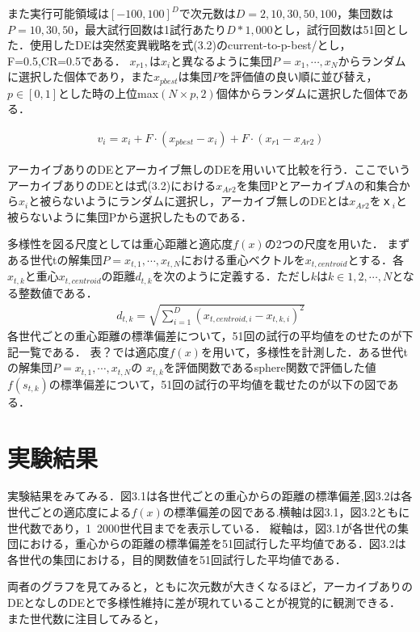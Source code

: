 \documentclass[a4paper,11pt,oneside,openany]{jsbook}
\begin{document}
また実行可能領域は$[-100, 100]^D$で次元数は$D=2,10,30,50,100$，集団数は$P=10,30,50$，最大試行回数は1試行あたり$D*1,000$とし，試行回数は51回とした．使用したDEは突然変異戦略を式(3.2)のcurrent-to-p-best/とし，F=0.5,CR=0.5である．
$x_{r1},$は${x_i}$と異なるように集団$P = {x_1, \cdots, x_N}$からランダムに選択した個体であり，また$x_{pbest}$は集団$P$を評価値の良い順に並び替え，${p\in[0,1]}とした時の上位$max$(N \times p, 2)$個体からランダムに選択した個体である．

\begin{eqnarray}
v_{i} = x_{i} + F\cdot(x_{pbest} - x_{i}) + F\cdot(x_{r1} - x_{Ar2})
\end{eqnarray}

アーカイブありのDEとアーカイブ無しのDEを用いいて比較を行う．ここでいうアーカイブありのDEとは式(3.2)における$x_{Ar2}$を集団PとアーカイブAの和集合から${x_i}$と被らないようにランダムに選択し，アーカイブ無しのDEとは$x_{Ar2}$を$ｘ_{i}$と被らないように集団Pから選択したものである．

多様性を図る尺度としては重心距離と適応度$f(x)$の2つの尺度を用いた．
まずある世代tの解集団$P = {x_{t,1}, \cdots, x_{t,N}}$における重心ベクトルを$x_{t,centroid}$とする．各$x_{t,k}$と重心$x_{t,centroid}$の距離$d_{t,k}$を次のように定義する．ただし$k$は$k\in {1,2,\cdots,N}$となる整数値である．
\begin{eqnarray}
d_{t,k} = \sqrt{\sum_{i=1}^{D} (x_{t,centroid,i} - x_{t,k,i})^2} 
\end{eqnarray}
各世代ごとの重心距離の標準偏差について，51回の試行の平均値をのせたのが下記一覧である．
表？では適応度$f(x)$を用いて，多様性を計測した．ある世代tの解集団$P = {x_{t,1}, \cdots, x_{t,N}}$の $x_{t,k}$を評価関数であるsphere関数で評価した値$f(s_{t,k})$の標準偏差について，51回の試行の平均値を載せたのが以下の図である．

\section{実験結果}
実験結果をみてみる．図3.1は各世代ごとの重心からの距離の標準偏差,図3.2は各世代ごとの適応度による$f(x)$の標準偏差の図である.横軸は図3.1，図3.2ともに世代数であり，1~2000世代目までを表示している．
縦軸は，図3.1が各世代の集団における，重心からの距離の標準偏差を51回試行した平均値である．図3.2は各世代の集団における，目的関数値を51回試行した平均値である．

両者のグラフを見てみると，ともに次元数が大きくなるほど，アーカイブありのDEとなしのDEとで多様性維持に差が現れていることが視覚的に観測できる．
また世代数に注目してみると，
\end{document}
